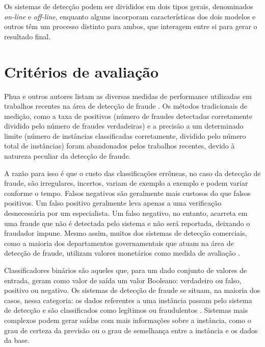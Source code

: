 Os sistemas de detecção podem ser divididos em dois tipos gerais, denominados \emph{on-line} e \emph{off-line}, enquanto alguns incorporam características dos dois modelos e outros têm um processo distinto para ambos, que interagem entre si para gerar o resultado final.

\section{Critérios de avaliação}
\label{sec:fraud_criteria}

Phua e outros autores listam as diversas medidas de performance utilizadas em trabalhos recentes na área de detecção de fraude \cite{Phua2010}. Os métodos tradicionais de medição, como a taxa de positivos (número de fraudes detectadas corretamente dividido pelo número de fraudes verdadeiras) e a precisão a um determinado limite (número de instâncias classificadas corretamente, dividido pelo número total de instâncias) foram abandonados pelos trabalhos recentes, devido à natureza peculiar da detecção de fraude.

A razão para isso é que o custo das classificações errôneas, no caso da detecção de fraude, são irregulares, incertos, variam de exemplo a exemplo e podem variar conforme o tempo. Falsos negativos são geralmente mais custosos do que falsos positivos. Um falso positivo geralmente leva apenas a uma verificação desnecessária por um especialista. Um falso negativo, no entanto, acarreta em uma fraude que não é detectada pelo sistema e não será reportada, deixando o fraudador impune. Mesmo assim, muitos dos sistemas de detecção comerciais, como a maioria dos departamentos governamentais que atuam na área de detecção de fraude, utilizam valores monetários como medida de avaliação \cite{Phua2010}.

Classificadores binários são aqueles que, para um dado conjunto de valores de entrada, geram como valor de saída um valor Booleano: verdadeiro ou falso, positivo ou negativo. Os sistemas de detecção de fraude se situam, na maioria dos casos, nessa categoria: os dados referentes a uma instância passam pelo sistema de detecção e são classificados como legítimos ou fraudulentos \cite{Bewick2004}. Sistemas mais complexos podem gerar saídas com mais informações sobre a instância, como o grau de certeza da previsão ou o grau de semelhança entre a instância e os dados da base.

